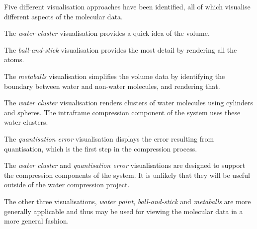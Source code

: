 Five different visualisation approaches have been identified, all of which
visualise different aspects of the molecular data.

The \emph{water cluster} visualisation provides a quick idea of the volume.

The \emph{ball-and-stick} visualisation provides the most detail by rendering
all the atoms.

The \emph{metaballs} visualisation simplifies the volume data by identifying
the boundary between water and non-water molecules, and rendering that.

The \emph{water cluster} visualisation renders clusters of water molecules
using cylinders and spheres. The intraframe compression component of the system
uses these water clusters.

The \emph{quantisation error} visualisation displays the error resulting from
quantisation, which is the first step in the compression process.

The \emph{water cluster} and \emph{quantisation error} visualisations are
designed to support the compression components of the system. It is unlikely
that they will be useful outside of the water compression project.

The other three visualisations, \emph{water point}, \emph{ball-and-stick} and
\emph{metaballs} are more generally applicable and thus may be used for viewing
the molecular data in a more general fashion.



